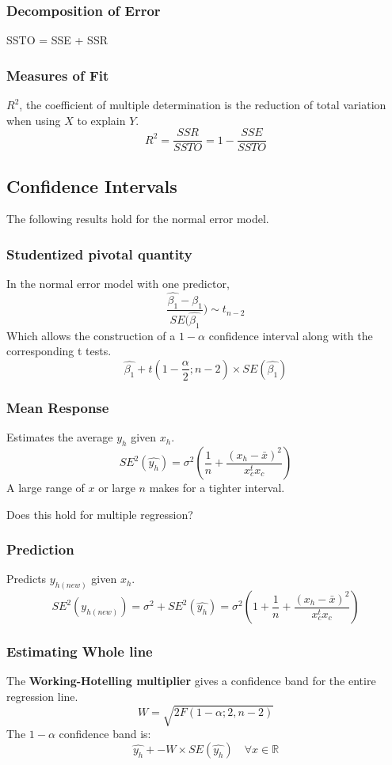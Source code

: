 \documentclass[12pt]{article}
\begin{document}
\subsubsection{Decomposition of Error}
SSTO = SSE + SSR

\subsubsection{Measures of Fit}

$R^2$, the coefficient of multiple determination is the reduction of total
variation when using $X$ to explain $Y$.
\[
    R^2 = \frac{SSR}{SSTO} = 1 - \frac{SSE}{SSTO}
\]


\subsection{Confidence Intervals}
The following results hold for the normal error model.

\subsubsection{Studentized pivotal quantity}
In the normal error model with one predictor, 
\[
    \frac{\hat{\beta_1} - \beta_1}{SE(\hat{\beta_1}}) \sim t_{n - 2}
\]
Which allows the construction of a $1 - \alpha$ confidence interval along
with the corresponding t tests.
\[
    \hat{\beta_1} + t(1 - \frac{\alpha}{2}; n - 2) \times
    SE(\hat{\beta_1})
\]

\subsubsection{Mean Response}
Estimates the average $y_h$ given $x_h$. 
\[
    SE^2(\hat{y_h}) = \sigma^2 (\frac{1}{n} + \frac{(x_h - \bar{x})^2}{x_c^t
x_c})
\]
A large range of $x$ or large $n$ makes for a tighter interval.

Does this hold for multiple regression?

\subsubsection{Prediction}
Predicts $y_{h(new)}$ given $x_h$. 
\[
    SE^2(y_{h(new)}) = \sigma^2 + SE^2(\hat{y_h})
    = \sigma^2 ( 1 + \frac{1}{n} + \frac{(x_h - \bar{x})^2}{x_c^t x_c})
\]

\subsubsection{Estimating Whole line}
The \textbf{Working-Hotelling multiplier} gives a confidence band for the
entire regression line.
\[
    W = \sqrt{2F(1 - \alpha;2, n-2)}
\]
The $1 - \alpha$ confidence band is:
\[
    \hat{y_h} +- W \times SE(\hat{y_h}) \quad \forall x \in \mathbb{R}
\]
\end{document}
